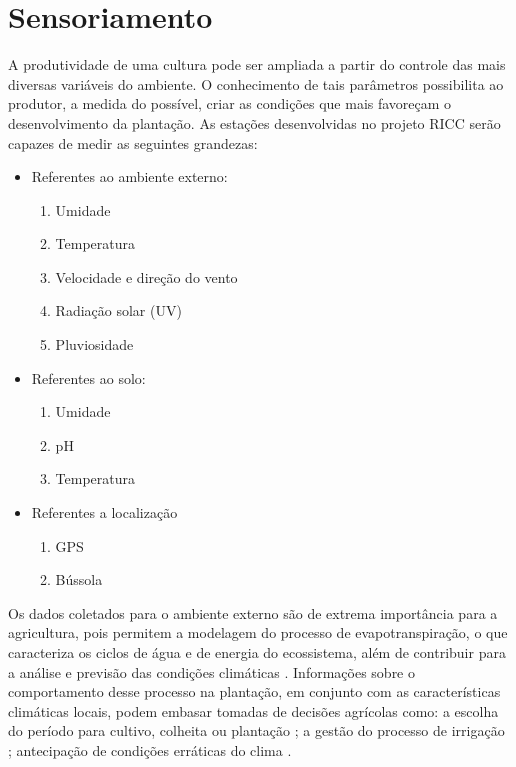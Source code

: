 \chapter[Sensoriamento]{Sensoriamento}

A produtividade de uma cultura pode ser ampliada a partir do controle das mais diversas variáveis do ambiente. O conhecimento de tais parâmetros possibilita ao produtor, a medida do possível, criar as condições que mais favoreçam o desenvolvimento da plantação. As estações desenvolvidas no projeto RICC serão capazes de medir as seguintes grandezas:

	\begin{itemize}
		\item Referentes ao ambiente externo:
		\begin{enumerate}
			\item Umidade
			\item Temperatura
			\item Velocidade e direção do vento
			\item Radiação solar (UV)
			\item Pluviosidade
		\end{enumerate}	 		
	
		\item Referentes ao solo:	
		\begin{enumerate}
			\item Umidade
			\item pH
			\item Temperatura
		\end{enumerate}
		
		\item Referentes a localização
		\begin{enumerate}
			\item GPS
			\item Bússola
		\end{enumerate}	 		
	\end{itemize}
	
	Os dados coletados para o ambiente externo são de extrema importância para a agricultura, pois permitem a modelagem do processo de evapotranspiração, o que caracteriza os ciclos de água e de energia do ecossistema, além de contribuir para a análise e previsão das condições climáticas \cite{perry2009increasing}. Informações sobre o comportamento desse processo na plantação, em conjunto com as características climáticas locais, podem embasar tomadas de decisões agrícolas como: a escolha do período para cultivo, colheita ou plantação \cite{frisvold2013use}; a gestão do processo de irrigação \cite{gowda2008mapping}; antecipação de condições erráticas do clima \cite{gommes2010guide}.
	
